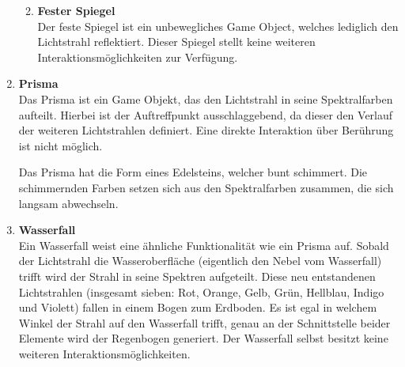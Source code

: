 \begin{enumerate}
\begin{enumerate}
    
    
    \item \textbf{Fester Spiegel} \hfill \\
    Der feste Spiegel ist ein unbewegliches Game Object, welches lediglich den Lichtstrahl reflektiert. Dieser Spiegel stellt keine weiteren Interaktionsmöglichkeiten zur Verfügung.
    
\end{enumerate}

\item \textbf{Prisma} \hfill \\
Das Prisma ist ein Game Objekt, das den Lichtstrahl in seine Spektralfarben aufteilt. Hierbei ist der Auftreffpunkt ausschlaggebend, da dieser den Verlauf der weiteren Lichtstrahlen definiert. Eine direkte Interaktion über Berührung ist nicht möglich.

Das Prisma hat die Form eines Edelsteins, welcher bunt schimmert. Die schimmernden Farben setzen sich aus den Spektralfarben zusammen, die sich langsam abwechseln.

\item \textbf{Wasserfall} \hfill \\
Ein Wasserfall weist eine ähnliche Funktionalität wie ein Prisma auf. Sobald der Lichtstrahl die Wasseroberfläche (eigentlich den Nebel vom Wasserfall) trifft wird der Strahl in seine Spektren aufgeteilt. Diese neu entstandenen Lichtstrahlen (insgesamt sieben: Rot, Orange, Gelb, Grün, Hellblau, Indigo und Violett) fallen in einem Bogen zum Erdboden. Es ist egal in welchem Winkel der Strahl auf den Wasserfall trifft, genau an der Schnittstelle beider Elemente wird der Regenbogen generiert. Der Wasserfall selbst besitzt keine weiteren Interaktionsmöglichkeiten.




\end{enumerate}
